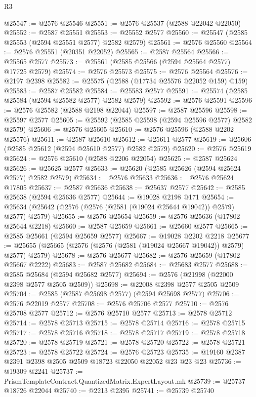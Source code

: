 \begin{lexlean}{R3}
\begin{coremodule}
@25547 := @2576 @25546
@25551 := @2576 @25537 (@2588 @22042 @22050)
@25552 := @2587 @25551
@25553 := @25552 @2577
@25560 := @25547 (@2585 @25553 (@2594 @25551 @2577) @2582 @2579)
@25561 := @2576 @25560
@25564 := @2576 @25551 (@20351 @22052)
@25565 := @2587 @25564
@25566 := @25565 @2577
@25573 := @25561 (@2585 @25566 (@2594 @25564 @2577) @17725 @2579)
@25574 := @2576 @25573
@25575 := @2576 @25564
@25576 := @2197 @2398
@25582 := @25575 (@2588 (@17734 @25576 @22052 @159) @159)
@25583 := @2587 @25582
@25584 := @25583 @2577
@25591 := @25574 (@2585 @25584 (@2594 @25582 @2577) @2582 @2579)
@25592 := @2576 @25591
@25596 := @2576 @25582 (@2588 @2198 @22044)
@25597 := @2587 @25596
@25598 := @25597 @2577
@25605 := @25592 (@2585 @25598 (@2594 @25596 @2577) @2582 @2579)
@25606 := @2576 @25605
@25610 := @2576 @25596 (@2588 @2202 @25576)
@25611 := @2587 @25610
@25612 := @25611 @2577
@25619 := @25606 (@2585 @25612 (@2594 @25610 @2577) @2582 @2579)
@25620 := @2576 @25619
@25624 := @2576 @25610 (@2588 @2206 @22054)
@25625 := @2587 @25624
@25626 := @25625 @2577
@25633 := @25620 (@2585 @25626 (@2594 @25624 @2577) @2582 @2579)
@25634 := @2576 @25633
@25636 := @2576 @25624 @17805
@25637 := @2587 @25636
@25638 := @25637 @2577
@25642 := @2585 @25638 (@2594 @25636 @2577)
@25644 := @19028 @2198 @171
@25654 := @25634 (@25642 (@2576 (@2576 (@2581 (@19024 @25644 @19042)) @2579) @2577) @2579)
@25655 := @2576 @25654
@25659 := @2576 @25636 (@17802 @25644 @2218)
@25660 := @2587 @25659
@25661 := @25660 @2577
@25665 := @2585 @25661 (@2594 @25659 @2577)
@25667 := @19028 @2202 @2218
@25677 := @25655 (@25665 (@2576 (@2576 (@2581 (@19024 @25667 @19042)) @2579) @2577) @2579)
@25678 := @2576 @25677
@25682 := @2576 @25659 (@17802 @25667 @2222)
@25683 := @2587 @25682
@25684 := @25683 @2577
@25688 := @2585 @25684 (@2594 @25682 @2577)
@25694 := @2576 (@21998 (@22000 @2398 @2577 @2505 @2509))
@25698 := @22008 @2398 @2577 @2505 @2509
@25704 := @2585 (@2587 @25698 @2577) (@2594 @25698 @2577)
@25706 := @2576 @22019 @2577
@25708 := @2576 @25706 @2577
@25710 := @2576 @25708 @2577
@25712 := @2576 @25710 @2577
@25713 := @2578 @25712
@25714 := @2578 @25713
@25715 := @2578 @25714
@25716 := @2578 @25715
@25717 := @2578 @25716
@25718 := @2578 @25717
@25719 := @2578 @25718
@25720 := @2578 @25719
@25721 := @2578 @25720
@25722 := @2578 @25721
@25723 := @2578 @25722
@25724 := @2576 @25723
@25735 := @19160 @2387 @2391 @2398 @2505 @2509 @18723 @22050 @22052 @23 @23 @23
@25736 := @19309 @2241
@25737 := PrismTemplateContract.QuantizedMatrix.ExpertLayout.mk
@25739 := @25737 @18726 @22044
@25740 := @2213 @2395
@25741 := @25739 @25740

\end{coremodule}
\end{lexlean}
